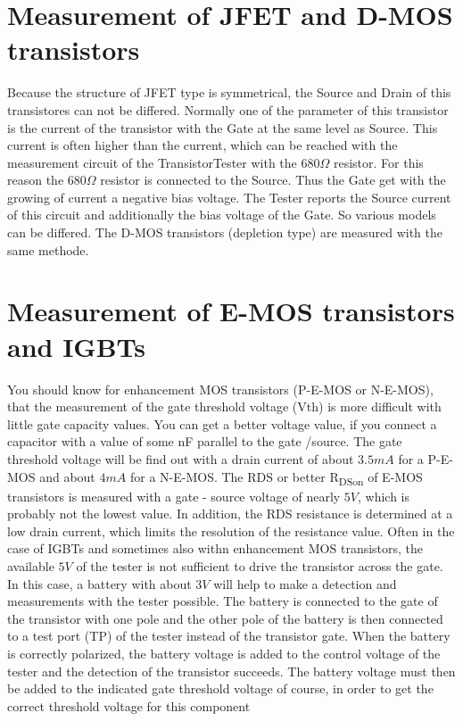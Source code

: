 \section{Measurement of JFET and D-MOS transistors}
Because the structure of JFET type is symmetrical, the Source and Drain of this transistores can not
be differed.
Normally one of the parameter of this transistor is the current of the transistor with the Gate at the same level as Source.
This current is often higher than the current, which can be reached with the measurement circuit of the TransistorTester
with the \(680\Omega\) resistor.
For this reason the \(680\Omega\) resistor is connected to the Source. Thus the Gate get with the growing of current a negative
bias voltage.
The Tester reports the Source current of this circuit and additionally the bias voltage of the Gate.
So various models can be differed.
The D-MOS transistors (depletion type) are measured with the same methode.

\section{Measurement of E-MOS transistors and IGBTs}
You should know for enhancement MOS transistors (P-E-MOS or N-E-MOS), that the measurement of the gate threshold voltage (Vth)
is more difficult with little gate capacity values. You can get a better voltage value, if you connect a capacitor with a value
of some nF parallel to the gate /source.
The gate threshold voltage will be find out with a drain current of about \(3.5mA\) for a P-E-MOS and about \(4mA\) for a N-E-MOS.
The RDS or better R\textsubscript{DSon} of E-MOS transistors is measured with a gate - source voltage of nearly \(5V\),
which is probably not the lowest value.
In addition, the RDS resistance is determined at a low drain current, which limits the resolution of the resistance value.
Often in the case of IGBTs and sometimes also withn enhancement MOS transistors, the available \(5V\) of the tester
is not sufficient to drive the transistor across the gate.
In this case, a battery with about \(3V\) will help to make a detection and measurements with the tester possible.
The battery is connected to the gate of the transistor with one pole and the other pole of the battery
is then connected to a test port (TP) of the tester instead of the transistor gate.
When the battery is correctly polarized, the battery voltage is added to the control voltage of the tester and
the detection of the transistor succeeds.
The battery voltage must then be added to the indicated gate threshold voltage of course,
in order to get the correct threshold voltage for this component


